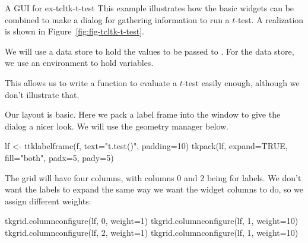 \begin{example}{A GUI for }{ex-tcltk-t-test}
This example illustrates how the basic widgets can be combined to make
a dialog for gathering information to run a $t$-test. A realization is
shown in Figure~\ref{fig:fig-tcltk-t-test}.






We will use a data store to hold the values to be passed to
. For the data store, we  use an environment to hold \Tcl\/ variables.

\begin{Schunk}
\end{Schunk}

This allows us to write a function to evaluate a $t$-test easily
enough, although we don't illustrate that.






Our layout is basic. Here we pack a label frame into the window to give the dialog a nicer look.
We will use the  geometry manager below.
\begin{Schunk}
\begin{Sinput}
 lf <- ttklabelframe(f, text="t.test()", padding=10)
 tkpack(lf, expand=TRUE, fill="both", padx=5, pady=5)
\end{Sinput}
\end{Schunk}

The grid will have four columns, with columns 0 and 2 being for labels.
We don't want the labels to expand the same way we want the widget columns to do, so we
assign different weights:
\begin{Schunk}
\begin{Sinput}
 tkgrid.columnconfigure(lf, 0, weight=1)
 tkgrid.columnconfigure(lf, 1, weight=10)
 tkgrid.columnconfigure(lf, 2, weight=1)
 tkgrid.columnconfigure(lf, 1, weight=10)
\end{Sinput}
\end{Schunk}



\end{example}
